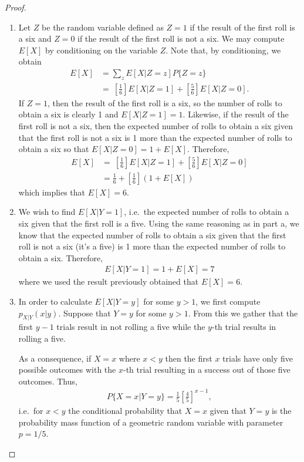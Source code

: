 \begin{proof}
  \begin{enumerate}
    \item Let $Z$ be the random variable defined
      as $Z=1$ if the result of the first roll is a six and $Z=0$ if the result of the first roll is not a six.
      We may compute $E[X]$ by conditioning on the variable $Z$.
      Note that, by conditioning, we obtain
      \begin{align*}
        E[X] &= \sum_z E[X|Z=z]P\{Z=z\} \\
        &= \ \left[\frac{1}{6}\right] E[X|Z=1] + \left[\frac{5}{6}\right] E[X|Z=0] .
      \end{align*}
      If $Z=1$, then the result of the first roll is a six, so the number of rolls to obtain a six is clearly 1 and $E[X|Z=1] = 1$.
      Likewise, if the result of the first roll is not a six, then the expected
      number of rolls to obtain a six given that the first roll is not a six is 1 more than
      the expected number of rolls to obtain a six so that $E[X|Z = 0] = 1 + E[X]$.
      Therefore,
      \begin{align*}
        E[X]
        &= \ \left[\frac{1}{6}\right] E[X|Z=1] + \left[\frac{5}{6}\right] E[X|Z=0]\\
        &= \frac{1}{6} + \left[\frac{1}{6}\right](1 + E[X])
      \end{align*}
      which implies that $E[X] = 6$.
    \item We wish to find $E[X|Y=1]$, i.e.\ the expected number of rolls to
      obtain a six given that the first roll is a five. Using the same reasoning
      as in part a, we know that the expected
      number of rolls to obtain a six given that the first roll is not a six (it's a five) is 1 more than
      the expected number of rolls to obtain a six. Therefore,
      \begin{align*}
        E[X|Y=1] = 1 + E[X] = 7
      \end{align*}
      where we used the result previously obtained that $E[X] = 6$.
    \item In order to calculate $E[X|Y=y]$ for some $y>1$, we first compute $p_{X|Y}(x|y)$.
      Suppose that $Y=y$ for some $y > 1$. From this we gather that the first
      $y-1$ trials result in not rolling a five while the $y$-th trial results in rolling a five.

      As a consequence, if $X=x$ where $x < y$ then the first $x$ trials have only five possible
      outcomes with the $x$-th trial resulting in a success out of those five outcomes. Thus,
      \begin{align*}
        P\{X=x | Y=y\} = \frac{1}{5}\left[\frac{4}{5}\right]^{x-1},
      \end{align*}
      i.e.\ for $x <y$ the conditional probability that $X=x$ given that $Y=y$ is
      the probability mass function of a geometric random variable with parameter $p=1/5$.


\end{enumerate}
\end{proof}
